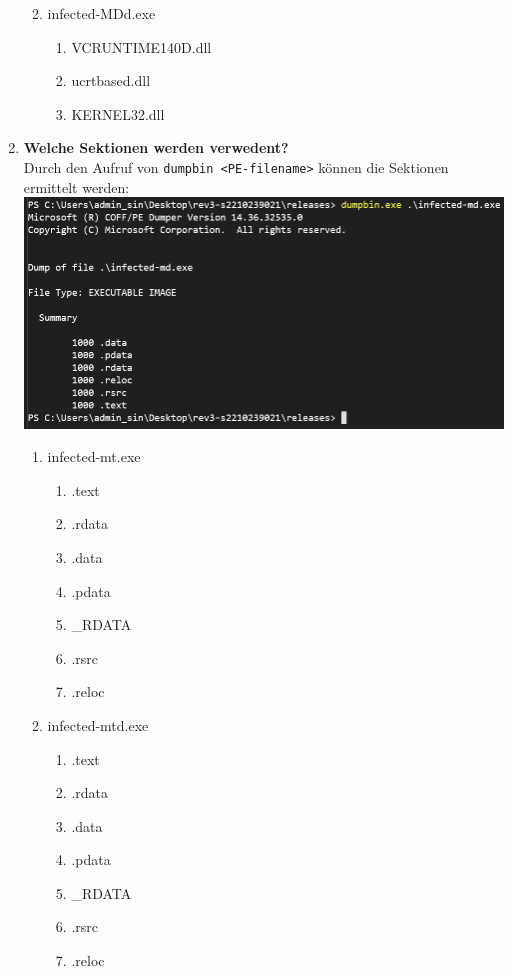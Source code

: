\documentclass{article}
\begin{document}
\begin{enumerate}
\begin{enumerate}
\begin{enumerate}
			\end{enumerate}
			\item infected-MDd.exe
			\begin{enumerate}
				\item VCRUNTIME140D.dll
				\item ucrtbased.dll
				\item KERNEL32.dll
			\end{enumerate}
		\end{enumerate}
		\pagebreak
		\item \textbf{Welche Sektionen werden verwedent?}\\
		Durch den Aufruf von \texttt{dumpbin <PE-filename>} können die Sektionen ermittelt werden:\\
		\includegraphics[width=1\linewidth]{pictures/1. dumpbin md}
		\begin{enumerate}
			\item infected-mt.exe
			\begin{enumerate}
				\item .text
				\item .rdata
				\item .data
				\item .pdata
				\item \_RDATA
				\item .rsrc
				\item .reloc
			\end{enumerate}
			\item infected-mtd.exe
			\begin{enumerate}
				\item .text
				\item .rdata
				\item .data
				\item .pdata
				\item \_RDATA
				\item .rsrc
				\item .reloc

\end{enumerate}
\end{enumerate}
\end{enumerate}
\end{document}
